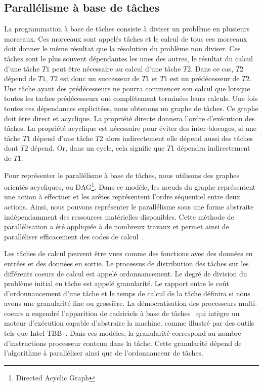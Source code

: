 \subsection{Parallélisme à base de tâches}
La programmation à base de tâches consiste à diviser un problème en plusieurs morceaux.
%
Ces morceaux sont appelés tâches et le calcul de tous ces morceaux doit donner le même résultat que la résolution du problème non diviser.
%
Ces tâches sont le plus souvent dépendantes les unes des autres, le résultat du calcul d'une tâche $T1$ peut être nécessaire au calcul d'une tâche $T2$.
%
Dans ce cas, $T2$ dépend de $T1$, $T2$ est donc un successeur de $T1$ et $T1$ est un prédécesseur de $T2$.
%
Une tâche ayant des prédécesseurs ne pourra commencer son calcul que lorsque toutes les taches prédécesseurs ont complètement terminées leurs calculs.
%
Une fois toutes ces dépendances explicitées, nous obtenons un graphe de tâches.
%
Ce graphe doit être direct et acyclique.
%
La propriété directe donnera l'ordre d'exécution des tâches.
%
La propriété acyclique est nécessaire pour éviter des inter-blocages, si une tâche $T1$ dépend d'une tâche $T2$ alors indirectement elle dépend aussi des tâches dont $T2$ dépend.
%
Or, dans un cycle, cela signifie que $T1$ dépendra indirectement de $T1$.

Pour représenter le parallélisme à base de tâches, nous utilisons des graphes orientés acycliques, ou DAG\footnote{Directed Acyclic Graph}.
%
Dans ce modèle, les n{\oe}uds du graphe représentent une action à effectuer et les arêtes représentent l'ordre séquentiel entre deux actions.
%
Ainsi, nous pouvons représenter le parallélisme sous une forme abstraite indépendamment des ressources matérielles disponibles.
%
Cette méthode de parallélisation a été appliquée à de nombreux travaux et permet ainsi de paralléliser efficacement des codes de calcul~\cite{BBAC2014,LSAT2013,LY2012,ABGL2013}.

Les tâches de calcul peuvent être vues comme des fonctions avec des données en entrées et des données en sortie.
%
Le processus de distribution des tâches sur les différents coeurs de calcul est appelé ordonnancement.
%
Le degré de division du problème initial en tâche est appelé granularité.
%
Le rapport entre le coût d'ordonnancement d'une tâche et le temps de calcul de la tâche définira si nous avons une granularité fine ou grossière.
%
La démocratisation des processeurs multi-coeurs a engendré l'apparition de cadriciels à base de tâches~\cite{taskscomparison} qui intègre un moteur d'exécution capable d'abstraire la machine.
 comme illustré par des outils tels que Intel TBB~\cite{Intel_TBB}.
%
Dans ces modèles, la granularité correspond au nombre d'instructions processeur contenu dans la tâche.
%
Cette granularité dépend de l'algorithme à paralléliser ainsi que de l'ordonnanceur de tâches.
